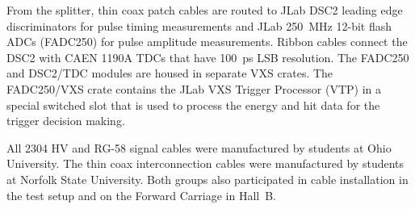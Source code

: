 From the splitter, thin coax patch cables are routed to JLab DSC2 leading edge discriminators for pulse timing
measurements and JLab 250~MHz 12-bit flash ADCs (FADC250) for pulse amplitude measurements. Ribbon cables
connect the DSC2 with CAEN 1190A TDCs that have 100~ps LSB resolution. The FADC250 and DSC2/TDC modules
are housed in separate VXS crates. The FADC250/VXS crate contains the JLab VXS Trigger Processor (VTP) in a
special switched slot that is used to process the energy and hit data for the trigger decision making.

All 2304 HV and RG-58 signal cables were manufactured by students at Ohio University. The thin coax interconnection
cables were  manufactured by students at Norfolk State University. Both groups also participated in cable installation
in the test setup and on the Forward Carriage in Hall~B.  
